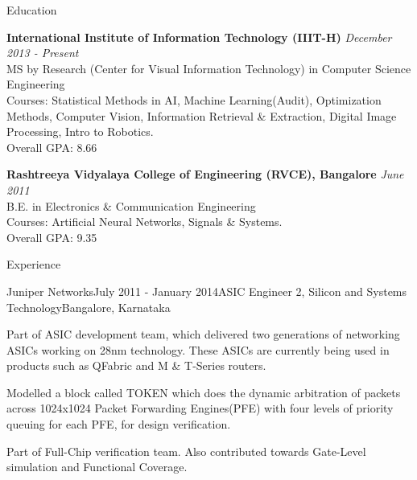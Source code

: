 \documentclass{resume} %
\begin{document}

\begin{rSection}{Education}

{\bf International Institute of Information Technology (IIIT-H)} \hfill {\em December 2013 - Present} \\ 
MS by Research (Center for Visual Information Technology) in Computer Science Engineering \smallskip \\
Courses: Statistical Methods in AI, Machine Learning(Audit), Optimization Methods, Computer Vision, Information Retrieval \& Extraction, Digital Image Processing, Intro to Robotics. \\
Overall GPA: 8.66  

{\bf Rashtreeya Vidyalaya College of Engineering (RVCE), Bangalore} \hfill {\em June 2011} \\ 
B.E. in Electronics \& Communication Engineering \smallskip \\
Courses: Artificial Neural Networks, Signals \& Systems. \\
Overall GPA: 9.35
\end{rSection}


\begin{rSection}{Experience}

\begin{rSubsection}{Juniper Networks}{July 2011 - January 2014}{ASIC Engineer 2, Silicon and Systems Technology}{Bangalore, Karnataka}
\item Part of ASIC development team, which delivered two generations of networking ASICs working on 28nm technology. These ASICs are currently being used in products such as QFabric and M \& T-Series routers. 
\item Modelled a block called TOKEN which does the dynamic arbitration of packets across 1024x1024 Packet Forwarding Engines(PFE) with four levels of priority queuing for each PFE, for design verification.
\item Part of Full-Chip verification team. Also contributed towards Gate-Level simulation and Functional Coverage.
\end{rSubsection}
\end{rSection}
\end{document}
